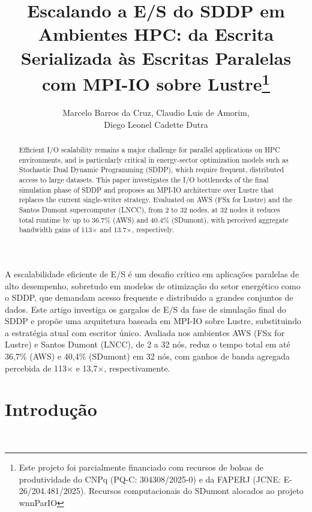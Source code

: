 \documentclass[12pt]{article}
\title{Escalando a E/S do SDDP em Ambientes HPC: da Escrita Serializada às Escritas Paralelas com MPI-IO sobre Lustre\thanks{Este projeto foi parcialmente financiado com recursos de bolsas de produtividade do CNPq (PQ-C: 304308/2025-0) e da FAPERJ (JCNE: E-26/204.481/2025). Recursos computacionais do SDumont alocados ao projeto wnnParIO}}
\author{Marcelo Barros da Cruz\orcidlink{0009-0008-5751-1238}\inst{1}, Claudio Luis de Amorim\orcidlink{0000-0003-1651-1967}\inst{1},\\ Diego Leonel Cadette Dutra\orcidlink{0000-0003-4262-7242}\inst{1}}
\begin{document}
\maketitle

\begin{abstract}
Efficient I/O scalability remains a major challenge for parallel applications on HPC environments, and is particularly critical in energy-sector optimization models such as Stochastic Dual Dynamic Programming (SDDP), which require frequent, distributed access to large datasets. This paper investigates the I/O bottlenecks of the final simulation phase of SDDP and proposes an MPI-IO architecture over Lustre that replaces the current single-writer strategy. Evaluated on AWS (FSx for Lustre) and the Santos Dumont supercomputer (LNCC), from 2 to 32 nodes, at 32 nodes it reduces total runtime by up to 36.7\% (AWS) and 40.4\% (SDumont), with perceived aggregate bandwidth gains of 113$\times$ and 13.7$\times$, respectively.
\end{abstract}

\begin{resumo}
A escalabilidade eficiente de E/S é um desafio crítico em aplicações paralelas de alto desempenho, sobretudo em modelos de otimização do setor energético como o SDDP, que demandam acesso frequente e distribuído a grandes conjuntos de dados. Este artigo investiga os gargalos de E/S da fase de simulação final do SDDP e propõe uma arquitetura baseada em MPI-IO sobre Lustre, substituindo a estratégia atual com escritor único. Avaliada nos ambientes AWS (FSx for Lustre) e Santos Dumont (LNCC), de 2 a 32 nós, reduz o tempo total em até 36,7\% (AWS) e 40,4\% (SDumont) em 32 nós, com ganhos de banda agregada percebida de 113$\times$ e 13,7$\times$, respectivamente.
\end{resumo}

\section{Introdução}~\label{sec:introducao}
\end{document}

